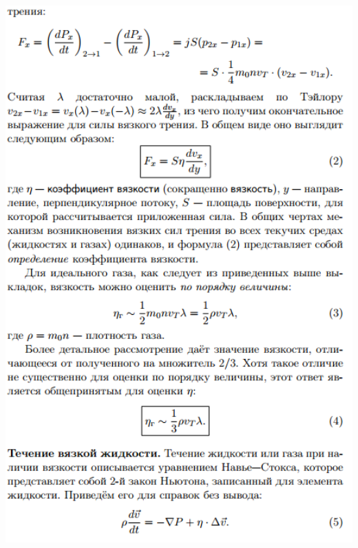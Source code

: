 \documentclass[12pt]{article}
\begin{document}
\begin{center}
    	\includegraphics[width=16cm]{theory_2.png}

\end{center}
\end{document}
